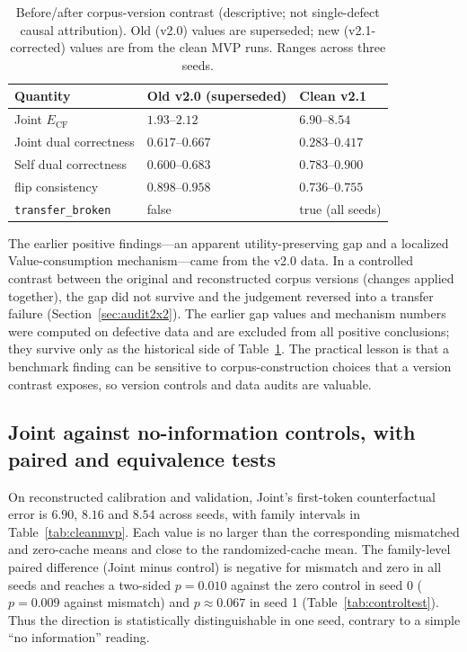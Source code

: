 \documentclass[11pt,a4paper]{article}
\begin{document}
\begin{table}[t]
\centering
\caption{Before/after corpus-version contrast (descriptive; not single-defect
causal attribution). Old (v2.0) values are superseded; new (v2.1-corrected)
values are from the clean MVP runs. Ranges across three seeds.}
\label{tab:reversal}
\begin{tabular}{lll}
\toprule
Quantity & Old v2.0 (superseded) & Clean v2.1 \\
\midrule
Joint $E_{\mathrm{CF}}$ & $1.93$--$2.12$ & $6.90$--$8.54$ \\
Joint dual correctness & $0.617$--$0.667$ & $0.283$--$0.417$ \\
Self dual correctness & $0.600$--$0.683$ & $0.783$--$0.900$ \\
flip consistency & $0.898$--$0.958$ & $0.736$--$0.755$ \\
\texttt{transfer\_broken} & false & true (all seeds) \\
\bottomrule
\end{tabular}
\end{table}

The earlier positive findings---an apparent utility-preserving gap and a
localized Value-consumption mechanism---came from the v2.0 data. In a controlled
contrast between the original and reconstructed corpus versions (changes
applied together), the gap did not survive and the judgement reversed into a
transfer failure (Section~\ref{sec:audit2x2}). The earlier gap values and
mechanism numbers were computed on defective data and are excluded from all
positive conclusions; they survive only as the historical side of
Table~\ref{tab:reversal}. The practical lesson is that a benchmark finding can
be sensitive to corpus-construction choices that a version contrast exposes,
so version controls and data audits are valuable.

\subsection{Joint against no-information controls, with paired and equivalence tests}
\label{sec:controls}

On reconstructed calibration and validation, Joint's first-token
counterfactual error is $6.90$, $8.16$ and $8.54$ across seeds, with family
intervals in Table~\ref{tab:cleanmvp}. Each value is no larger than the
corresponding mismatched and zero-cache means and close to the randomized-cache
mean. The family-level
paired difference (Joint minus control) is negative for mismatch and zero in
all seeds and reaches a two-sided $p=0.010$ against the zero control in seed 0
($p=0.009$ against mismatch) and $p\approx0.067$ in seed 1
(Table~\ref{tab:controltest}). Thus the direction is statistically
distinguishable in one seed, contrary to a simple ``no information'' reading.
\end{document}
